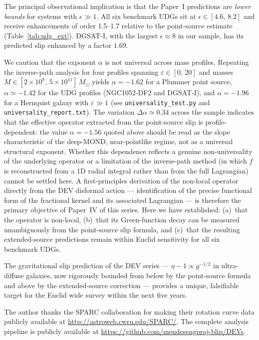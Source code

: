 \documentclass[aps,prd,twocolumn,superscriptaddress,nofootinbib]{revtex4-2}
\begin{document}
The principal observational implication is that the
Paper~I predictions are \emph{lower bounds} for systems
with $\epsilon \gg 1$. All six benchmark UDGs sit at
$\epsilon \in [4.6,\,8.2]$ and receive enhancements of
order 1.5--1.7 relative to the point-source estimate
(Table~\ref{tab:udg_ext}). DGSAT-I, with the largest
$\epsilon \approx 8$ in our sample, has its predicted
slip enhanced by a factor $1.69$.

We caution that the exponent $\alpha$ is not universal
across mass profiles. Repeating the inverse-path analysis
for four profiles spanning $\varepsilon \in [0,\,20]$ and
masses $M \in [2\!\times\!10^{8},\,5\!\times\!10^{11}]\,
M_\odot$ yields $\alpha = -1.62$ for a Plummer point
source, $\alpha \simeq -1.42$ for the UDG profiles
(NGC1052-DF2 and DGSAT-I), and $\alpha = -1.96$ for a
Hernquist galaxy with $\varepsilon \gg 1$
(see \texttt{universality\_test.py} and
\texttt{universality\_report.txt}). The variation
$\Delta\alpha \simeq 0.34$ across the sample indicates
that the effective operator extracted from the point-source
slip is profile-dependent: the value $\alpha = -1.56$
quoted above should be read as the slope characteristic
of the deep-MOND, near-pointlike regime, not as a universal
structural exponent. Whether this dependence reflects a
genuine non-universality of the underlying operator or a
limitation of the inverse-path method (in which $f$ is
reconstructed from a 1D radial integral rather than from
the full Lagrangian) cannot be settled here. A
first-principles derivation of the non-local operator
directly from the DEV disformal action --- identification
of the precise functional form of the fractional kernel
and its associated Lagrangian --- is therefore the
primary objective of Paper~IV of this series. Here we have established: (a)~that the
operator is non-local, (b)~that its Green-function decay
can be measured unambiguously from the point-source slip
formula, and (c)~that the resulting extended-source
predictions remain within Euclid sensitivity for all six
benchmark UDGs.

The gravitational slip prediction of the DEV series ---
$\eta-1 \propto g^{-1/2}$ in ultra-diffuse galaxies,
now rigorously bounded from below by the point-source
formula and above by the extended-source correction ---
provides a unique, falsifiable target for the Euclid
wide survey within the next five years.

\begin{acknowledgments}
The author thanks the SPARC collaboration for making their
rotation curve data publicly available at
\url{http://astroweb.cwru.edu/SPARC/}. The complete
analysis pipeline is publicly available at
\url{https://github.com/mendesengproj-blip/DEVs}.
\end{acknowledgments}
\end{document}
